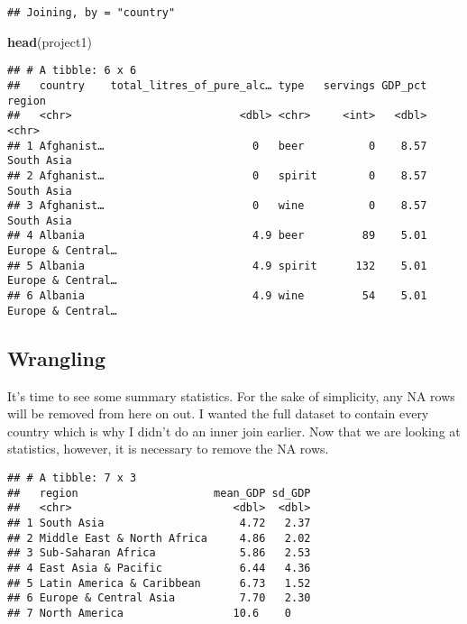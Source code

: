 \documentclass[]{article}
\newenvironment{Shaded}{\begin{snugshade}}{\end{snugshade}}
\newcommand{\KeywordTok}[1]{\textcolor[rgb]{0.13,0.29,0.53}{\textbf{#1}}}
\newcommand{\DataTypeTok}[1]{\textcolor[rgb]{0.13,0.29,0.53}{#1}}
\newcommand{\OperatorTok}[1]{\textcolor[rgb]{0.81,0.36,0.00}{\textbf{#1}}}
\newcommand{\NormalTok}[1]{#1}
\begin{document}
\begin{verbatim}
## Joining, by = "country"
\end{verbatim}

\begin{Shaded}
\begin{Highlighting}[]
\KeywordTok{head}\NormalTok{(project1)}
\end{Highlighting}
\end{Shaded}

\begin{verbatim}
## # A tibble: 6 x 6
##   country    total_litres_of_pure_alc… type   servings GDP_pct region           
##   <chr>                          <dbl> <chr>     <int>   <dbl> <chr>            
## 1 Afghanist…                       0   beer          0    8.57 South Asia       
## 2 Afghanist…                       0   spirit        0    8.57 South Asia       
## 3 Afghanist…                       0   wine          0    8.57 South Asia       
## 4 Albania                          4.9 beer         89    5.01 Europe & Central…
## 5 Albania                          4.9 spirit      132    5.01 Europe & Central…
## 6 Albania                          4.9 wine         54    5.01 Europe & Central…
\end{verbatim}

\subsection{Wrangling}\label{wrangling}

It's time to see some summary statistics. For the sake of simplicity,
any NA rows will be removed from here on out. I wanted the full dataset
to contain every country which is why I didn't do an inner join earlier.
Now that we are looking at statistics, however, it is necessary to
remove the NA rows.

\begin{Shaded}
\end{Shaded}

\begin{verbatim}
## # A tibble: 7 x 3
##   region                     mean_GDP sd_GDP
##   <chr>                         <dbl>  <dbl>
## 1 South Asia                     4.72   2.37
## 2 Middle East & North Africa     4.86   2.02
## 3 Sub-Saharan Africa             5.86   2.53
## 4 East Asia & Pacific            6.44   4.36
## 5 Latin America & Caribbean      6.73   1.52
## 6 Europe & Central Asia          7.70   2.30
## 7 North America                 10.6    0
\end{verbatim}
\end{document}
